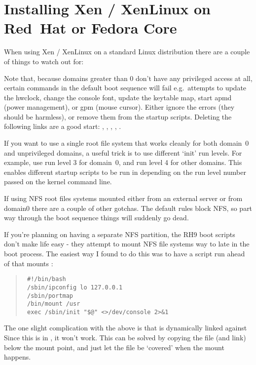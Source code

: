 \chapter{Installing Xen / XenLinux on Red~Hat or Fedora Core}

When using Xen / XenLinux on a standard Linux distribution there are a
couple of things to watch out for:

Note that, because domains greater than 0 don't have any privileged
access at all, certain commands in the default boot sequence will fail
e.g.\ attempts to update the hwclock, change the console font, update
the keytable map, start apmd (power management), or gpm (mouse
cursor).  Either ignore the errors (they should be harmless), or
remove them from the startup scripts.  Deleting the following links
are a good start: {}, {},
{}, {}, {}.

If you want to use a single root file system that works cleanly for
both domain~0 and unprivileged domains, a useful trick is to use
different `init' run levels. For example, use run level 3 for
domain~0, and run level 4 for other domains. This enables different
startup scripts to be run in depending on the run level number passed
on the kernel command line.

If using NFS root files systems mounted either from an external server
or from domain0 there are a couple of other gotchas.  The default
{} rules block NFS, so part way through
the boot sequence things will suddenly go dead.

If you're planning on having a separate NFS {} partition,
the RH9 boot scripts don't make life easy - they attempt to mount NFS
file systems way to late in the boot process. The easiest way I found
to do this was to have a {} script run ahead of
{} that mounts {}:

\begin{quote}
  \begin{small}\begin{verbatim}
 #!/bin/bash
 /sbin/ipconfig lo 127.0.0.1
 /sbin/portmap
 /bin/mount /usr
 exec /sbin/init "$@" <>/dev/console 2>&1
\end{verbatim}\end{small}
\end{quote}


The one slight complication with the above is that
{} is dynamically linked against
{} Since this is in {}, it
won't work. This can be solved by copying the file (and link) below
the {} mount point, and just let the file be `covered' when
the mount happens.

